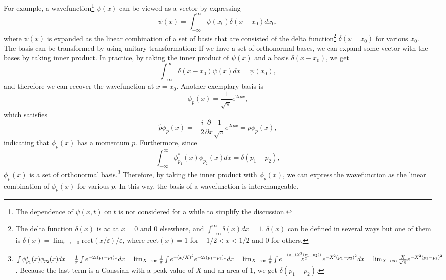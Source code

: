 \documentclass{book}
\begin{document}
For example, a wavefunction\footnote{The dependence of $\psi(x,t)$ on $t$ is not considered for a while to simplify the discussion.} $\psi(x)$ can be viewed as a vector by expressing
\begin{equation}
  \psi(x) = \int_{-\infty}^{\infty}\psi(x_0)\delta(x-x_0)dx_0,
\end{equation}
where $\psi(x)$ is expanded as the linear combination of a set of basis that are consisted of the delta function\footnote{The delta function $\delta(x)$ is $\infty$ at $x = 0$ and $0$ elsewhere, and $\int_{-\infty}^{\infty}\delta(x)dx = 1$. $\delta(x)$ can be defined in several ways but one of them is $\delta(x) = \lim_{\varepsilon \to +0} \mathrm{rect}(x/\varepsilon)/\varepsilon$, where  $\mathrm{rect}(x) = 1$ for $-1/2 < x < 1/2$ and 0 for others.}
 $\delta(x-x_0)$ for various $x_0$. 
The basis can be transformed by using unitary transformation: If we have a set of orthonormal bases, we can expand some vector with the bases by taking inner product.
In practice, by taking the inner product of $\psi(x)$ and a basis $\delta(x-x_0)$, we get
\begin{equation}
  \int_{-\infty}^{\infty}\delta(x-x_0)\psi(x)dx = \psi(x_0),
\end{equation}
and therefore we can recover the wavefunction at $x = x_0$. Another exemplary basis is
\begin{equation}
  \phi_p(x) = \frac {1}{\sqrt{\pi}} e^{2ipx},
\end{equation}
which satisfies 
\begin{equation}
  \hat p \phi_p(x) = -\frac{i}{2}\frac{\partial}{\partial x} \frac{1}{\sqrt\pi}e^{2ipx} = p \phi_p(x),
\end{equation}
indicating that $\phi_p(x)$ has a momentum $p$. Furthermore, since
\begin{equation}
  \int_{-\infty}^{\infty}\phi_{p_1}^*(x)\phi_{p_2}(x)dx = \delta(p_1 - p_2),
\end{equation}
$\phi_p(x)$ is a set of orthonormal basis.\footnote{$\int\phi_{p_1}^*(x)\phi_{p_2}(x)dx = \frac 1 \pi \int e^{-2i(p_1-p_2)x}dx = \lim_{X\to\infty}\frac 1 \pi \int e^{-(x/X)^2}e^{-2i(p_1-p_2)x}dx\\= \lim_{X\to\infty}\frac 1 \pi \int e^{-\frac{(x-iX^2(p_1-p_2))}{X^2}}e^{-X^2(p_1-p_2)^2}dx = \lim_{X\to\infty}\frac X {\sqrt \pi}e^{-X^2(p_1-p_2)^2}$. Because the last term is a Gaussian with a peak value of $X$ and an area of 1, we get $\delta(p_1-p_2)$.}
Therefore, by taking the inner product with $\phi_p(x)$, we can express the wavefunction as the linear combination of $\phi_p(x)$ for various $p$. In this way, the basis of a wavefunction is interchangeable. 
\end{document}
